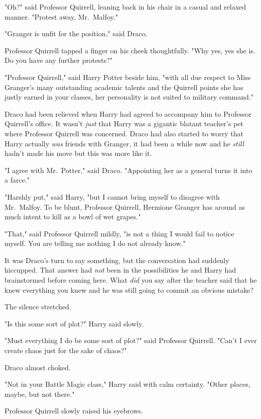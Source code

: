 "Oh?" said Professor Quirrell, leaning back in his chair in a casual and
relaxed manner. "Protest away, Mr.~Malfoy."

"Granger is unfit for the position," said Draco.

Professor Quirrell tapped a finger on his cheek thoughtfully. "Why yes, yes she
is. Do you have any further protests?"

"Professor Quirrell," said Harry Potter beside him, "with all due respect to
Miss Granger's many outstanding academic talents and the Quirrell points she
has justly earned in your classes, her personality is not suited to military
command."

Draco had been relieved when Harry had agreed to accompany him to Professor
Quirrell's office. It wasn't \emph{just} that Harry was a gigantic blatant
teacher's pet where Professor Quirrell was concerned. Draco had also started to
worry that Harry actually \emph{was} friends with Granger, it had been a while
now and he \emph{still} hadn't made his move{\el} but this was more like it.

"I agree with Mr.~Potter," said Draco. "Appointing her as a general turns it
into a farce."

"Harshly put," said Harry, "but I cannot bring myself to disagree with
Mr.~Malfoy. To be blunt, Professor Quirrell, Hermione Granger has around as
much intent to kill as a bowl of wet grapes."

"That," said Professor Quirrell mildly, "is not a thing I would fail to notice
myself. You are telling me nothing I do not already know."

It was Draco's turn to say something, but the conversation had suddenly
hiccupped. That answer had \emph{not} been in the possibilities he and Harry
had brainstormed before coming here. What \emph{did} you say after the teacher
said that he knew everything you knew and he was still going to commit an
obvious mistake?

The silence stretched.

"Is this some sort of plot?" Harry said slowly.

"Must everything I do be some sort of plot?" said Professor Quirrell. "Can't I
ever create chaos just for the sake of chaos?"

Draco almost choked.

"Not in your Battle Magic class," Harry said with calm certainty. "Other
places, maybe, but not there."

Professor Quirrell slowly raised his eyebrows.

